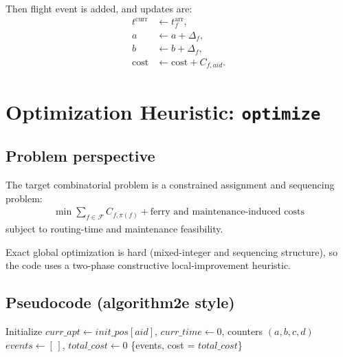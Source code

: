 \documentclass[11pt,a4paper]{article}
\begin{document}
Then flight event is added, and updates are:
\begin{align*}
t^{\text{curr}} &\leftarrow t_f^{\text{arr}},\\
a &\leftarrow a + \Delta_f,\\
b &\leftarrow b + \Delta_f,\\
\text{cost} &\leftarrow \text{cost} + C_{f,aid}.
\end{align*}

\section{Optimization Heuristic: \texttt{optimize}}
\subsection{Problem perspective}
The target combinatorial problem is a constrained assignment and sequencing problem:
\begin{align*}
\min \sum_{f \in \mathcal{F}} C_{f,\pi(f)} + \text{ferry and maintenance-induced costs}
\end{align*}
subject to routing-time and maintenance feasibility.

Exact global optimization is hard (mixed-integer and sequencing structure), so the code uses a two-phase constructive local-improvement heuristic.

\subsection{Pseudocode (algorithm2e style)}
\begin{algorithm}[h]
\caption{\texttt{get\_timeline(aid, fids)}}
Initialize $curr\_apt \leftarrow init\_pos[aid]$, $curr\_time \leftarrow 0$, counters $(a,b,c,d)$\;
$events \leftarrow [\,]$, $total\_cost \leftarrow 0$\;
\Return \{events, cost = $total\_cost$\}\;
\end{algorithm}
\end{document}
